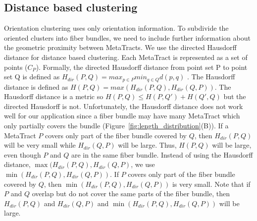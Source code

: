   
\subsection{Distance based clustering}
 \label{subsec:dist_clustering}
Orientation clustering uses only orientation information. To subdivide the oriented clusters into fiber bundles, we need to include further information about the geometric proximity between MetaTracts. We use the directed Hausdorff distance for distance based clustering.
Each MetaTract is represented as a set of points ($C_P$). Formally, the directed Hausdorff distance from point set P to point set Q is defined as 
$H_{dir}(P,Q) = max_{p \in P} min_{q \in Q} d(p,q)$ .
The Hausdorff distance is defined as $H(P,Q) = max(H_{dir}(P,Q),H_{dir}(Q,P))$.
The Hausdorff distance is a metric so $H(P,Q) \le H(P,Q') + H(Q',Q)$ but the directed Hausdorff is not.
Unfortunately, the Hausdorff distance does not work well for our application since a fiber bundle may have many MetaTract which only partially covers the bundle (Figure~\ref{fig:length_distribution}(B)). If a MetaTract $P$ covers only part of the fiber bundle covered by $Q$, then $H_{dir}(P,Q)$ will be very small while $H_{dir}(Q,P)$ will be large.
Thus, $H(P,Q)$ will be large, even though $P$ and $Q$ are in the same fiber bundle.
Instead of using the Hausdorff distance, $\max(H_{dir}(P,Q),H_{dir}(Q,P)$, we use $\min(H_{dir}(P,Q),H_{dir}(Q,P))$. If $P$ covers only part of the fiber bundle covered by $Q$, then $\min(H_{dir}(P,Q),H_{dir}(Q,P))$ is very small.
Note that if $P$ and $Q$ overlap but do not cover the same parts of the fiber bundle, then $H_{dir}(P,Q)$ and $H_{dir}(Q,P)$ and $\min(H_{dir}(P,Q),H_{dir}(Q,P))$ will be large.
 

